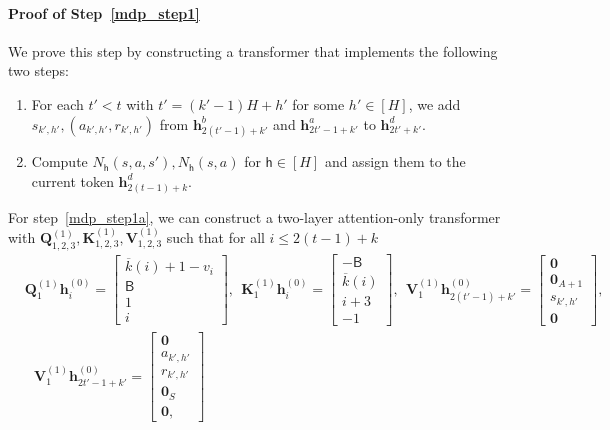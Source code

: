 \documentclass[10pt]{article}
\renewcommand{\bar}{\overline}
\newcommand{\<}{\left\langle}
\renewcommand{\>}{\right\rangle}
\renewcommand{\bQ}{\mathbf{Q}}
\newcommand{\bzero}{{\mathbf 0}}
\newcommand{\parta}{{a}}
\newcommand{\partb}{{b}}
\newcommand{\partd}{{d}}
\newcommand{\state}{{s}}
\newcommand{\action}{{a}}
\newcommand{\reward}{{r}}
\newcommand{\horizon}{{H}}
\renewcommand{\horizon}{{H}}
\newcommand{\tfthres}{{\mathsf{B}}}
\newcommand{\Numst}{{S}}
\newcommand{\Numact}{{A}}
\newcommand{\Numvi}{{N}}
\newcommand{\oddeven}{{v}}
\def\bK{{\mathbf K}}
\def\bQ{{\mathbf Q}}
\def\bV{{\mathbf V}}
\def\bh{{\mathbf h}}
\def\sh{{\mathsf{h}}}
\begin{document}
\paragraph{Proof of Step~\ref{mdp_step1}} We prove this step by constructing a transformer that implements the following two steps:
\begin{enumerate}[label= Step 1\alph*, ref= 1\alph*]
    \item\label{mdp_step1a} For each $t'< t$ with $t'=(k'-1)\horizon+h'$ for some $h'\in[\horizon]$, we add  $\state_{k',h'},(\action_{k',h'},\reward_{k',h'})$ from  $\bh^\partb_{2(t'-1)+k'}$ and $\bh^\parta_{2t'-1+k'}$  to  $\bh^\partd_{2t'+k'}$.
    \item\label{mdp_step1b} Compute $\Numvi_{\sh}(\state,\action,\state'),\Numvi_{\sh}(\state,\action)$ for $\sh\in[\horizon]$ and assign them to the current token $\bh^\partd_{2(t-1)+k}$.
\end{enumerate}
For step~\ref{mdp_step1a}, we can construct a two-layer attention-only transformer with $\bQ^{(1)}_{1,2,3},\bK^{(1)}_{1,2,3},\bV^{(1)}_{1,2,3}$ such that for all $i\leq 2(t-1)+k$
\begin{align*}
&\bQ^{(1)}_{1}\bh^{(0)}_{i}=
\begin{bmatrix}
        \bar{k}(i)+1-\oddeven_{i}\\
        \tfthres\\
        1\\
       i
    \end{bmatrix},~~ \bK^{(1)}_{1}\bh^{(0)}_{i}=\begin{bmatrix}
        -\tfthres\\\bar{k}(i)\\ i+3\\-1
\end{bmatrix},~~ \bV^{(1)}_{1}\bh^{(0)}_{2(t'-1)+k'}=
\begin{bmatrix}
\bzero\\\bzero_{\Numact+1}\\\state_{k',h'}\\\bzero\end{bmatrix},\\
&~~~
\bV^{(1)}_{1}\bh^{(0)}_{2t'-1+k'}=
\begin{bmatrix}
\bzero\\\action_{k',h'}\\
\reward_{k',h'}
\\\bzero_\Numst\\\bzero,\end{bmatrix}
\end{align*}
\end{document}
